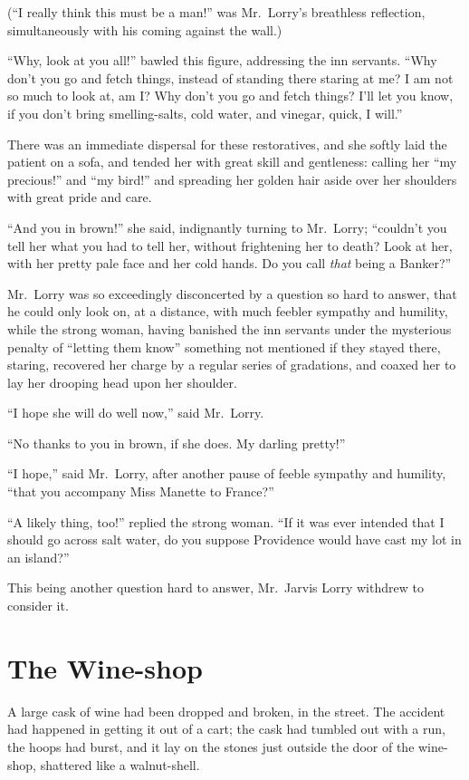(``I really think this must be a man!'' was Mr.\ Lorry's breathless
reflection, simultaneously with his coming against the wall.)

``Why, look at you all!'' bawled this figure, addressing the inn
servants.  ``Why don't you go and fetch things, instead of standing
there staring at me?  I am not so much to look at, am I?  Why don't
you go and fetch things?  I'll let you know, if you don't bring
smelling-salts, cold water, and vinegar, quick, I will.''

There was an immediate dispersal for these restoratives, and she
softly laid the patient on a sofa, and tended her with great skill
and gentleness:  calling her ``my precious!'' and ``my bird!'' and spreading
her golden hair aside over her shoulders with great pride and care.

``And you in brown!'' she said, indignantly turning to Mr.\ Lorry;
``couldn't you tell her what you had to tell her, without frightening
her to death?  Look at her, with her pretty pale face and her cold
hands.  Do you call \emph{that} being a Banker?''

Mr.\ Lorry was so exceedingly disconcerted by a question so hard to
answer, that he could only look on, at a distance, with much feebler
sympathy and humility, while the strong woman, having banished the
inn servants under the mysterious penalty of ``letting them know''
something not mentioned if they stayed there, staring, recovered her
charge by a regular series of gradations, and coaxed her to lay her
drooping head upon her shoulder.

``I hope she will do well now,'' said Mr.\ Lorry.

``No thanks to you in brown, if she does.  My darling pretty!''

``I hope,'' said Mr.\ Lorry, after another pause of feeble sympathy and
humility, ``that you accompany Miss Manette to France?''

``A likely thing, too!'' replied the strong woman.  ``If it was ever
intended that I should go across salt water, do you suppose
Providence would have cast my lot in an island?''

This being another question hard to answer, Mr.\ Jarvis Lorry withdrew
to consider it.


\chapter{The Wine-shop}


A large cask of wine had been dropped and broken, in the street.
The accident had happened in getting it out of a cart; the cask had
tumbled out with a run, the hoops had burst, and it lay on the stones
just outside the door of the wine-shop, shattered like a
walnut-shell.

